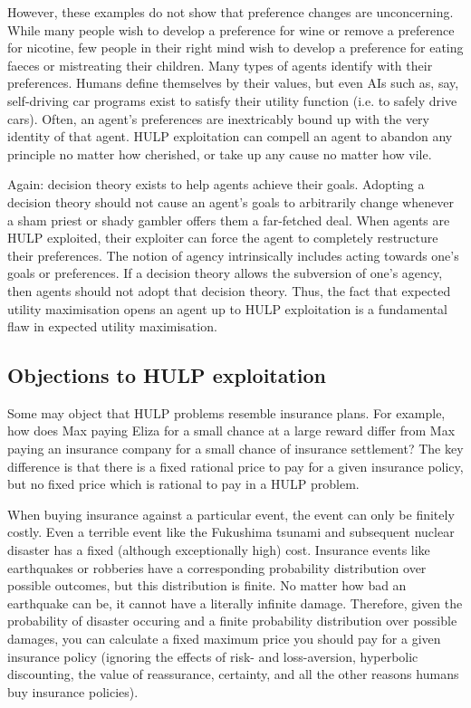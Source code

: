 \documentclass{article}
\begin{document}
However, these examples do not show that preference changes are unconcerning. While many people wish to develop a preference for wine or remove a preference for nicotine, few people in their right mind wish to develop a preference for eating faeces or mistreating their children. Many types of agents identify with their preferences. Humans define themselves by their values, but even AIs such as, say, self-driving car programs exist to satisfy their utility function (i.e. to safely drive cars). Often, an agent's preferences are inextricably bound up with the very identity of that agent. HULP exploitation can compell an agent to abandon any principle no matter how cherished, or take up any cause no matter how vile. 

Again: decision theory exists to help agents achieve their goals. Adopting a decision theory should not cause an agent's goals to arbitrarily change whenever a sham priest or shady gambler offers them a far-fetched deal. When agents are HULP exploited, their exploiter can force the agent to completely restructure their preferences. The notion of agency intrinsically includes acting towards one's goals or preferences. If a decision theory allows the subversion of one's agency, then agents should not adopt that decision theory. Thus, the fact that expected utility maximisation opens an agent up to HULP exploitation is a fundamental flaw in expected utility maximisation.

\subsection{Objections to HULP exploitation}

Some may object that HULP problems resemble insurance plans. For example, how does Max paying Eliza for a small chance at a large reward differ from Max paying an insurance company for a small chance of insurance settlement? The key difference is that there is a fixed rational price to pay for a given insurance policy, but no fixed price which is rational to pay in a HULP problem.

When buying insurance against a particular event, the event can only be finitely costly. Even a terrible event like the Fukushima tsunami and subsequent nuclear disaster has a fixed (although exceptionally high) cost. Insurance events like earthquakes or robberies have a corresponding probability distribution over possible outcomes, but this distribution is finite. No matter how bad an earthquake can be, it cannot have a literally infinite damage. Therefore, given the probability of disaster occuring and a finite probability distribution over possible damages, you can calculate a fixed maximum price you should pay for a given insurance policy (ignoring the effects of risk- and loss-aversion, hyperbolic discounting, the value of reassurance, certainty, and all the other reasons humans buy insurance policies). 
\end{document}

